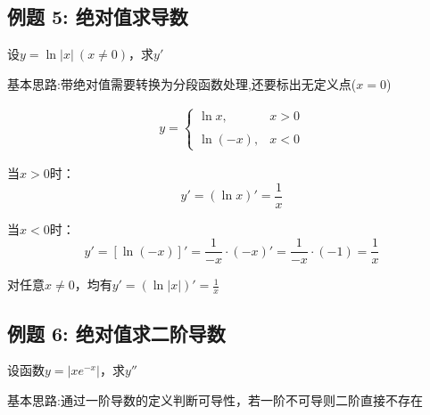 \documentclass[11pt,a4paper,UTF8]{ctexart}
\begin{document}
\subsection{例题 5: 绝对值求导数}

设$y = \ln\vert{}x\vert{}\ (x \neq 0)$，求$y'$

基本思路:带绝对值需要转换为分段函数处理,还要标出无定义点($x=0$)

\begin{solbox}[分步推导与答题规范]

\begin{align*}
y = \begin{cases} \ln x, & x > 0\\ \\ \ln(-x), & x < 0 \end{cases}
\end{align*}


当$x > 0$时：
\begin{equation*}
y' = (\ln x)' = \frac{1}{x}
\end{equation*}


当$x < 0$时：
\begin{equation*}
y' = [\ln(-x)]' = \frac{1}{-x} \cdot (-x)' = \frac{1}{-x} \cdot (-1) = \frac{1}{x}
\end{equation*}


对任意$x \neq 0$，均有$y' = (\ln\vert{}x\vert{})' = \frac{1}{x}$
\end{solbox}


\subsection{例题 6: 绝对值求二阶导数}

设函数$y = \vert{}xe^{-x}\vert{}$，求$y''$

基本思路:通过一阶导数的定义判断可导性，若一阶不可导则二阶直接不存在
\end{document}
